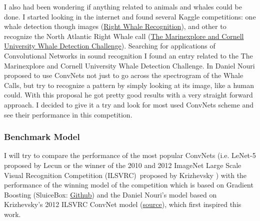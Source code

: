 \documentclass[]{article}
\newcommand{\competition}{The Marinexplore and Cornell University Whale Detection Challenge}
\newcommand{\imagenet}{ImageNet Large Scale Visual Recognition Competition (ILSVRC)}
\begin{document}
I also had been wondering if anything related to animals and whales could be done. I started looking in the internet and found several Kaggle competitions: one whale detection though images (\href{https://www.kaggle.com/c/noaa-right-whale-recognition}{Right Whale Recognition}), and other to recognize the North Atlantic Right Whale call (\href{https://www.kaggle.com/c/whale-detection-challenge}{\competition}). Searching for applications of Convolutional Networks in sound recognition I found an entry related to the \competition. In \cite{Nouriblog} Daniel Nouri proposed to use ConvNets not just to go across the spectrogram of the Whale Calls, but try to recognize a pattern by simply looking at its image, like a human could. With this proposal he got pretty good results with a very straight forward approach. I decided to give it a try and look for most used ConvNets scheme and see their performance in this competition.

\subsubsection{Benchmark Model}\label{benchmark-model}

I will try to compare the performance of the most popular ConvNets (i.e. LeNet-5 proposed by Lecun \cite{Lecun98} or the winner of the 2010 and 2012 \imagenet \, proposed by Krizhevsky \cite{Krizhevsky12}) with the performance of the winning model of the competition which is based on Gradient Boosting (SluiceBox: \href{https://github.com/nmkridler/moby}{Github}) and the Daniel Nouri's model based on Krizhevsky's 2012 ILSVRC ConvNet model \cite{Krizhevsky12} (\href{https://speakerdeck.com/dnouri/practical-deep-neural-nets-for-detecting-marine-mammals/}{source}), which first inspired this work.
\end{document}
